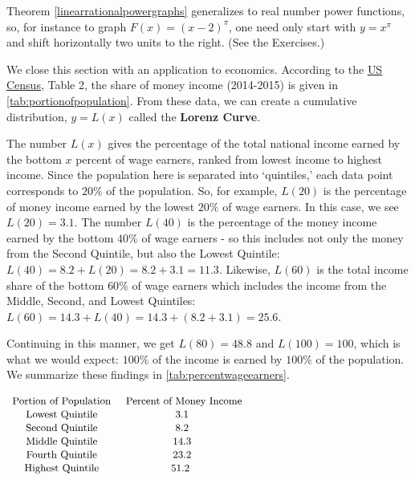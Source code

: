 Theorem \ref{linearrationalpowergraphs}  generalizes to real number power functions, so, for instance to graph $F(x) = (x-2)^{\pi}$, one need only start with $y = x^{\pi}$ and shift horizontally two units to the right.  (See the Exercises.)  

We close this section with an application to economics.  According to the \href{http://www.census.gov/library/publications/2016/demo/p60-256.html }{\underline{US Census}}, Table 2, the share of money income (2014-2015) is given in \autoref{tab:portionofpopulation}. From these data, we can create a cumulative distribution, $y = L(x)$ called the \textbf{Lorenz Curve}.   

The number $L(x)$ gives the percentage of the total national income earned by the bottom $x$ percent of wage earners, ranked from lowest income to highest income.  Since the population here is separated into `quintiles,' each data point corresponds to $20 \%$ of the population.  So, for example, $L(20)$ is the percentage of money income earned by the lowest $20 \%$ of wage earners.  In this case, we see $L(20) = 3.1$.  The number  $L(40)$ is the percentage of the money income earned by the bottom $40 \%$ of wage earners - so this includes not only the money from the Second Quintile, but also the Lowest Quintile:  $L(40) = 8.2 + L(20) = 8.2 +  3.1 = 11.3$.  Likewise, $L(60)$ is the total income share of the bottom $60 \%$ of wage earners which includes the income from the Middle, Second, and Lowest Quintiles:  $L(60) = 14.3 + L(40) = 14.3 + (8.2+3.1) = 25.6$.  

Continuing in this manner, we get $L(80) = 48.8$ and $L(100) = 100$, which is what we would expect:  $100 \%$ of the income is earned by $100 \%$ of the population.  We summarize these findings in \autoref{tab:percentwageearners}.

\begin{table}
\begin{center}
  
$ \begin{array}{cc}

\text{\small Portion of Population} & \text{ \small Percent of Money Income} \\

\text{\small Lowest Quintile} & \text{\small  3.1} \\

\text{\small Second Quintile} &\text{\small   8.2}  \\

\text{\small Middle Quintile} &  \text{\small 14.3}  \\

\text{\small Fourth Quintile} &  \text{\small  23.2}  \\

\text{\small Highest Quintile} &   \text{\small 51.2 } \\

\end{array} $

\caption{}
\label{tab:portionofpopulation}
\end{center}
\end{table}

